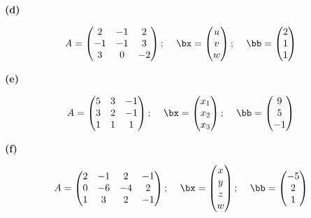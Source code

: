 \documentclass[oneside,12pt]{amsart}
\begin{document}
\textbf{(d)}

$$
\begin{matrix}
A=
\begin{pmatrix}
2 & -1  & 2\\
-1 & -1 & 3 \\
3 & 0 & -2 \\
\end{pmatrix}
\text{; }
&
\bx=
\begin{pmatrix}
u \\ v \\ w
\end{pmatrix}
\text{;  }
&
\bb=
\begin{pmatrix}
2 \\ 1 \\ 1
\end{pmatrix}
\end{matrix}
$$

\textbf{(e)}

$$
\begin{matrix}
A=
\begin{pmatrix}
5 & 3  & -1\\
3 & 2 & -1 \\
1 & 1 & 1 \\
\end{pmatrix}
\text{; }
&
\bx=
\begin{pmatrix}
x_1 \\ x_2 \\ x_3
\end{pmatrix}
\text{;  }
&
\bb=
\begin{pmatrix}
9 \\ 5 \\ -1
\end{pmatrix}
\end{matrix}
$$

\textbf{(f)}

$$
\begin{matrix}
A=
\begin{pmatrix}
2 & -1  & 2 & -1\\
0 & -6 & -4 & 2 \\
1 & 3 & 2 & -1 \\
\end{pmatrix}
\text{; }
&
\bx=
\begin{pmatrix}
x \\ y \\ z \\ w
\end{pmatrix}
\text{;  }
&
\bb=
\begin{pmatrix}
-5 \\2 \\ 1
\end{pmatrix}
\end{matrix}
$$
\end{document}
